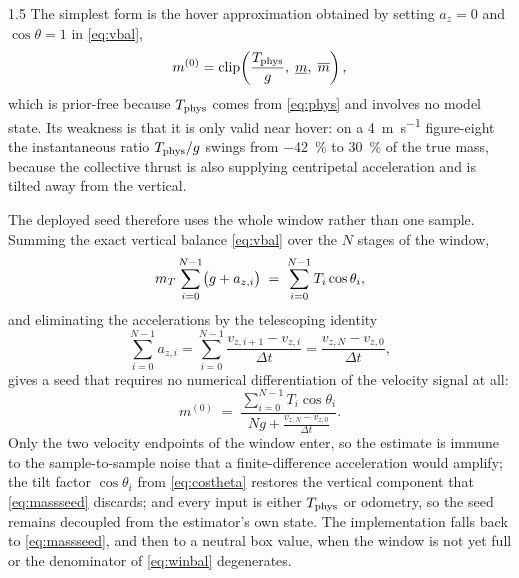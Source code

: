 \begin{spacing}{1.5}
The simplest form is the hover approximation obtained by setting $a_z=0$ and
$\cos\theta=1$ in \eqref{eq:vbal},
\begin{equation}
m^{(0)}=\operatorname{clip}\!\left(\frac{T_{\mathrm{phys}}}{g},\; \underline m,\; \overline m\right),
\label{eq:massseed}
\end{equation}
which is prior-free because $T_{\mathrm{phys}}$ comes from \eqref{eq:phys} and involves no
model state. Its weakness is that it is only valid near hover: on a
\SI{4}{\meter\per\second} figure-eight the instantaneous ratio $T_{\mathrm{phys}}/g$ swings
from \SI{-42}{\percent} to \SI{+30}{\percent} of the true mass, because the
collective thrust is also supplying centripetal acceleration and is tilted away
from the vertical.

The deployed seed therefore uses the whole window rather than one sample. Summing
the exact vertical balance \eqref{eq:vbal} over the $N$ stages of the window,
\begin{equation}
m_T \sum_{i=0}^{N-1}\bigl(g + a_{z,i}\bigr) \;=\; \sum_{i=0}^{N-1} T_i \cos\theta_i ,
\label{eq:winbal1}
\end{equation}
and eliminating the accelerations by the telescoping identity
\begin{equation}
\sum_{i=0}^{N-1} a_{z,i}
= \sum_{i=0}^{N-1} \frac{v_{z,i+1}-v_{z,i}}{\Delta t}
= \frac{v_{z,N}-v_{z,0}}{\Delta t},
\label{eq:telescope}
\end{equation}
gives a seed that requires no numerical differentiation of the velocity signal at
all:
\begin{equation}
m^{(0)} \;=\; \frac{\displaystyle\sum_{i=0}^{N-1} T_i \cos\theta_i}
                   {\displaystyle N g + \frac{v_{z,N}-v_{z,0}}{\Delta t}} .
\label{eq:winbal}
\end{equation}
Only the two velocity endpoints of the window enter, so the estimate is immune to
the sample-to-sample noise that a finite-difference acceleration would amplify;
the tilt factor $\cos\theta_i$ from \eqref{eq:costheta} restores the vertical
component that \eqref{eq:massseed} discards; and every input is either $T_{\mathrm{phys}}$
or odometry, so the seed remains decoupled from the estimator's own state. The
implementation falls back to \eqref{eq:massseed}, and then to a neutral box
value, when the window is not yet full or the denominator of \eqref{eq:winbal}
degenerates.


\end{spacing}
